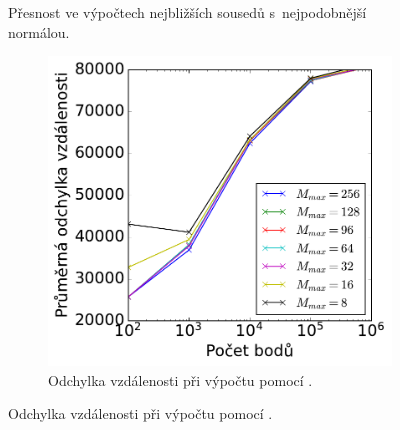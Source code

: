 \begin{figure}
\begin{subfigure}[t]{0.49\columnwidth}
\end{subfigure}
\caption{Přesnost ve výpočtech nejbližších sousedů s~nejpodobnější normálou.}
\label{fig:accurucybench_normal_acc}

\end{figure}


\begin{figure}
 
\begin{subfigure}[t]{0.49\columnwidth}
    \centering  
    \includegraphics[scale=0.6]{obrazky-figures/benchmark/accuracy/normal/acccurucy_first_err_distance.pdf}
    \caption{Odchylka vzdálenosti při výpočtu pomocí .}


\end{subfigure}
\end{figure}
